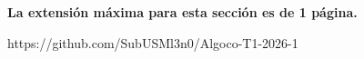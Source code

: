 \begin{mdframed}
    \textbf{La extensión máxima para esta sección es de 1 página.}
\end{mdframed}

https://github.com/SubUSMl3n0/Algoco-T1-2026-1